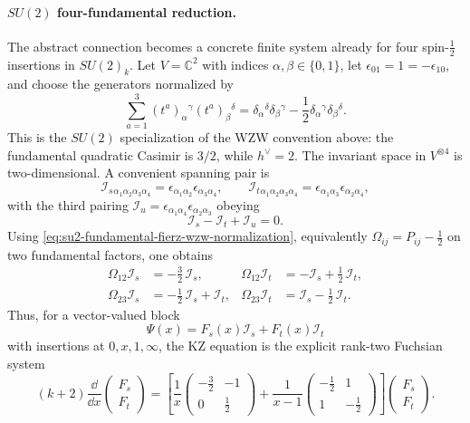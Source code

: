 \paragraph{\texorpdfstring{\(SU(2)\) four-fundamental reduction.}{SU(2) four-fundamental reduction.}}
The abstract connection becomes a concrete finite system already for four
spin-\(\frac12\) insertions in \(SU(2)_k\).  Let \(V=\mathbb C^2\) with
indices \(\alpha,\beta\in\{0,1\}\), let
\(\epsilon_{01}=1=-\epsilon_{10}\), and choose the generators normalized by
\begin{equation}
  \sum_{a=1}^3
  (t^a)_\alpha{}^\gamma (t^a)_\beta{}^\delta
  =
  \delta_\alpha{}^\delta\delta_\beta{}^\gamma
  -\frac12\delta_\alpha{}^\gamma\delta_\beta{}^\delta .
  \label{eq:su2-fundamental-fierz-wzw-normalization}
\end{equation}
This is the \(SU(2)\) specialization of the WZW convention above: the
fundamental quadratic Casimir is \(3/2\), while \(h^\vee=2\).  The invariant
space in \(V^{\otimes4}\) is two-dimensional.  A convenient spanning pair is
\[
  \mathcal I_s{}_{\alpha_1\alpha_2\alpha_3\alpha_4}
  =
  \epsilon_{\alpha_1\alpha_2}\epsilon_{\alpha_3\alpha_4},
  \qquad
  \mathcal I_t{}_{\alpha_1\alpha_2\alpha_3\alpha_4}
  =
  \epsilon_{\alpha_1\alpha_3}\epsilon_{\alpha_2\alpha_4},
\]
with the third pairing
\(\mathcal I_u=\epsilon_{\alpha_1\alpha_4}\epsilon_{\alpha_2\alpha_3}\)
obeying
\begin{equation}
  \mathcal I_s-\mathcal I_t+\mathcal I_u=0 .
  \label{eq:su2-four-invariant-relation}
\end{equation}
Using \eqref{eq:su2-fundamental-fierz-wzw-normalization}, equivalently
\(\Omega_{ij}=P_{ij}-\frac12\) on two fundamental factors, one obtains
\begin{align}
  \Omega_{12}\mathcal I_s
  &=-\frac32\,\mathcal I_s,
  &
  \Omega_{12}\mathcal I_t
  &=-\mathcal I_s+\frac12\,\mathcal I_t,
  \label{eq:su2-omega12-invariant-action}\\
  \Omega_{23}\mathcal I_s
  &=-\frac12\,\mathcal I_s+\mathcal I_t,
  &
  \Omega_{23}\mathcal I_t
  &=\mathcal I_s-\frac12\,\mathcal I_t .
  \label{eq:su2-omega23-invariant-action}
\end{align}
Thus, for a vector-valued block
\[
  \Psi(x)=F_s(x)\mathcal I_s+F_t(x)\mathcal I_t
\]
with insertions at \(0,x,1,\infty\), the KZ equation is the explicit
rank-two Fuchsian system
\begin{equation}
  (k+2)\frac{\dd}{\dd x}
  \begin{pmatrix}F_s\\ F_t\end{pmatrix}
  =
  \left[
    \frac1x
    \begin{pmatrix}
      -\frac32 & -1\\
      0 & \frac12
    \end{pmatrix}
    +
    \frac1{x-1}
    \begin{pmatrix}
      -\frac12 & 1\\
      1 & -\frac12
    \end{pmatrix}
  \right]
  \begin{pmatrix}F_s\\ F_t\end{pmatrix}.
  \label{eq:su2-four-fundamental-kz-system}
\end{equation}

